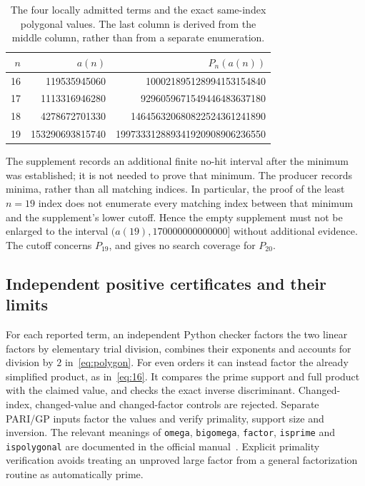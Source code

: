 \documentclass[11pt]{article}
\theoremstyle{remark}
\begin{document}
\begin{table}[htbp]
\centering
\small
\begin{tabular}{rrr}
\toprule
$n$ & $a(n)$ & $P_n(a(n))$\\
\midrule
16 & 119535945060 & 100021895128994153154840\\
17 & 1113316946280 & 9296059671549446483637180\\
18 & 4278672701330 & 146456320680822524361241890\\
19 & 153290693815740 & 199733312889341920908906236550\\
\bottomrule
\end{tabular}
\caption{The four locally admitted terms and the exact same-index polygonal
values. The last column is derived from the middle column, rather than
from a separate enumeration.}\label{tab:values}
\end{table}

The supplement records an additional finite no-hit interval after the minimum
was established; it is not needed to prove that minimum.
The producer records minima, rather than all matching indices. In particular,
the proof of the least $n=19$ index does not enumerate every matching index
between that minimum and the supplement's lower cutoff. Hence the empty
supplement must not be enlarged to the interval $(a(19),170000000000000]$
without additional evidence. The cutoff concerns $P_{19}$, and gives no
search coverage for $P_{20}$.

\subsection{Independent positive certificates and their limits}\label{sec:cert}
For each reported term, an independent Python checker factors the two linear
factors by elementary trial division, combines their exponents and accounts
for division by $2$ in~\eqref{eq:polygon}. For even orders it can instead
factor the already simplified product, as in~\eqref{eq:16}. It compares the
prime support and full product with the claimed value, and checks the exact
inverse discriminant. Changed-index, changed-value and changed-factor
controls are rejected. Separate PARI/GP inputs factor the values and verify
primality, support size and inversion. The relevant meanings of
\texttt{omega}, \texttt{bigomega}, \texttt{factor}, \texttt{isprime} and
\texttt{ispolygonal} are documented in the official manual~\cite{pari}.
Explicit primality verification avoids treating an unproved large factor
from a general factorization routine as automatically prime.
\end{document}
